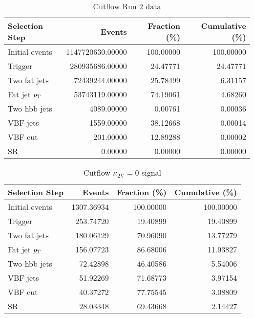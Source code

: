 \begin{table}[htbp]
    \centering
    \caption{Cutflow Run 2 data}
    \begin{tabular}{lrrr}
        \hline
        \textbf{Selection Step} & \textbf{Events}  & \textbf{Fraction (\%)} & \textbf{Cumulative (\%)} \\ \hline
        Initial events          & 1147720630.00000 & 100.00000              & 100.00000                \\\hline
        Trigger                 & 280935686.00000  & 24.47771               & 24.47771                 \\
        Two fat jets            & 72439244.00000   & 25.78499               & 6.31157                  \\
        Fat jet $p_{\text{T}}$           & 53743119.00000   & 74.19061               & 4.68260                  \\
        Two hbb jets            & 4089.00000       & 0.00761                & 0.00036                  \\
        VBF jets                & 1559.00000       & 38.12668               & 0.00014                  \\
        VBF cut                 & 201.00000        & 12.89288               & 0.00002                  \\
        SR                      & 0.00000          & 0.00000                & 0.00000                  \\\hline
    \end{tabular}
\end{table}

\begin{table}[htbp]
    \centering
    \caption{Cutflow $\kappa_\text{2V}=0$ signal}
    \begin{tabular}{lrrr}
        \hline
        \textbf{Selection Step} & \textbf{Events} & \textbf{Fraction (\%)} & \textbf{Cumulative (\%)} \\ \hline
        Initial events          & 1307.36934      & 100.00000              & 100.00000                \\\hline
        Trigger                 & 253.74720       & 19.40899               & 19.40899                 \\
        Two fat jets            & 180.06129       & 70.96090               & 13.77279                 \\
        Fat jet $p_{\text{T}}$           & 156.07723       & 86.68006               & 11.93827                 \\
        Two hbb jets            & 72.42898        & 46.40586               & 5.54006                  \\
        VBF jets                & 51.92269        & 71.68773               & 3.97154                  \\
        VBF cut                 & 40.37272        & 77.75545               & 3.08809                  \\
        SR                      & 28.03348        & 69.43668               & 2.14427                  \\\hline
    \end{tabular}
\end{table}




